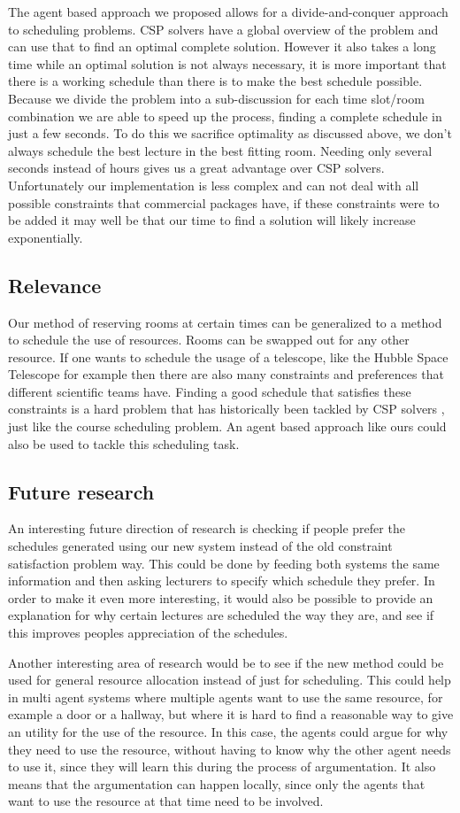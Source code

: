 The agent based approach we proposed allows for a divide-and-conquer approach to
scheduling problems. CSP solvers have a global overview of the problem and can
use that to find an optimal complete solution. However it also takes a long time
while an optimal solution is not always necessary, it is more important that
there is a working schedule than there is to make the best schedule possible.
Because we divide the problem into a sub-discussion for each time slot/room
combination we are able to speed up the process, finding a complete schedule in
just a few seconds. To do this we sacrifice optimality as discussed above, we
don't always schedule the best lecture in the best fitting room. Needing only
several seconds instead of hours gives us a great advantage over CSP solvers.
Unfortunately our implementation is less complex and can not deal with all
possible constraints that commercial packages have, if these constraints were to
be added it may well be that our time to find a solution will likely increase
exponentially.

\subsection{Relevance}
Our method of reserving rooms at certain times can be generalized to a method to
schedule the use of resources. Rooms can be swapped out for any other resource.
If one wants to schedule the usage of a telescope, like the Hubble Space
Telescope for example then there are also many constraints and preferences that
different scientific teams have. Finding a good schedule that satisfies these
constraints is a hard problem that has historically been tackled by CSP solvers
\cite{johnston1994spike}, just like the course scheduling problem. An agent
based approach like ours could also be used to tackle this scheduling task.

\subsection{Future research}
An interesting future direction of research is checking if people prefer
the schedules generated using our new system instead of the old constraint
satisfaction problem way. This could be done by feeding both systems
the same information and then asking lecturers to specify which schedule
they prefer. In order to make it even more interesting, it would also be
possible to provide an explanation for why certain lectures are scheduled
the way they are, and see if this improves peoples appreciation of the
schedules.

Another interesting area of research would be to see if the new method
could be used for general resource allocation instead of just for
scheduling. This could help in multi agent systems where multiple agents
want to use the same resource, for example a door or a hallway, but where
it is hard to find a reasonable way to give an utility for the use of the
resource. In this case, the agents could argue for why they need to use the
resource, without having to know why the other agent needs to use it, since
they will learn this during the process of argumentation. It also means
that the argumentation can happen locally, since only the agents that want
to use the resource at that time need to be involved.
